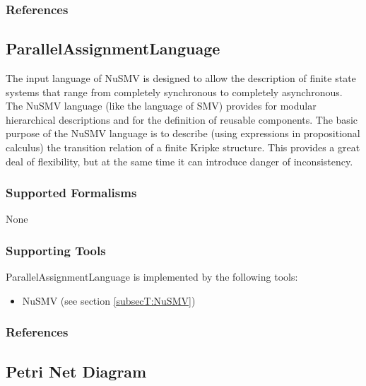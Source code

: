 \subsubsection{References}





\subsection{ParallelAssignmentLanguage}
\label{subsecL:ParallelAssignmentLanguage}


The input language of NuSMV is designed to allow the description of finite state systems that range from completely synchronous to completely asynchronous. The NuSMV language (like the language of SMV) provides for modular hierarchical descriptions and for the definition of reusable components. The basic purpose of the NuSMV language is to describe (using expressions in propositional calculus) the transition relation of a finite Kripke structure. This provides a great deal of flexibility, but at the same time it can introduce danger of inconsistency.

\subsubsection{Supported Formalisms}

None


\subsubsection{Supporting Tools}

ParallelAssignmentLanguage is implemented by the following tools:
\begin{itemize}
	\item NuSMV (see section \ref{subsecT:NuSMV})
\end{itemize}


\subsubsection{References}




\subsection{Petri Net Diagram}
\label{subsecL:PetriNetDiagram}

